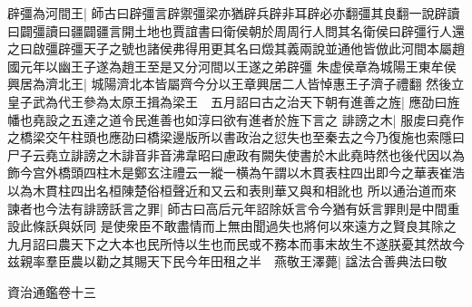 辟彊為河間王|{
	師古曰辟彊言辟禦彊梁亦猶辟兵辟非耳辟必亦翻彊其良翻一說辟讀曰闢彊讀曰疆闢疆言開土地也賈誼書曰衛侯朝於周周行人問其名衛侯曰辟彊行人還之曰啟彊辟彊天子之號也諸侯弗得用更其名曰燬其義兩說並通他皆倣此河間本屬趙國元年以幽王子遂為趙王至是又分河間以王遂之弟辟彊}
朱虚侯章為城陽王東牟侯興居為濟北王|{
	城陽濟北本皆屬齊今分以王章興居二人皆悼惠王子濟子禮翻}
然後立皇子武為代王參為太原王揖為梁王　五月詔曰古之治天下朝有進善之旌|{
	應劭曰旌幡也堯設之五達之道令民進善也如淳曰欲有進者於旌下言之}
誹謗之木|{
	服䖍曰堯作之橋梁交午柱頭也應劭曰橋梁邊版所以書政治之愆失也至秦去之今乃復施也索隱曰尸子云堯立誹謗之木誹音非音沸韋昭曰慮政有闕失使書於木此堯時然也後代因以為飾今宫外橋頭四柱木是鄭玄注禮云一縱一横為午謂以木貫表柱四出即今之華表崔浩以為木貫柱四出名桓陳楚俗桓聲近和又云和表則華又與和相訛也}
所以通治道而來諫者也今法有誹謗訞言之罪|{
	師古曰高后元年詔除妖言令今猶有妖言罪則是中間重設此條訞與妖同}
是使衆臣不敢盡情而上無由聞過失也將何以來遠方之賢良其除之　九月詔曰農天下之大本也民所恃以生也而民或不務本而事末故生不遂朕憂其然故今兹親率羣臣農以勸之其賜天下民今年田租之半　燕敬王澤薨|{
	諡法合善典法曰敬}


資治通鑑卷十三
